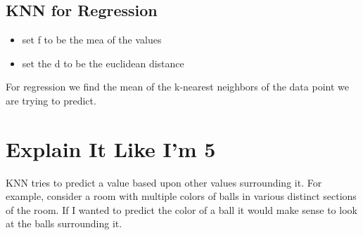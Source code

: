 \documentclass{article}
\begin{document}
\subsection{KNN for Regression}
    \begin{itemize}
        \item set f to be the mea of the values 
        \item set the d to be the euclidean distance 
    \end{itemize}
    For regression we find the mean of the k-nearest neighbors of the data point we are trying to predict. 





\section{Explain It Like I'm 5}

KNN tries to predict a value based upon other values surrounding it. For example, consider a room with multiple colors of balls in various distinct sections of the room. 
If I wanted to predict the color of a ball it would make sense to look at the balls surrounding it.
\end{document}
